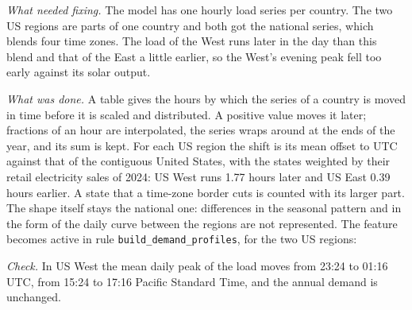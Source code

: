 \textit{What needed fixing.}
The model has one hourly load series per country.
The two US regions are parts of one country and both got the national series, which blends four time zones.
The load of the West runs later in the day than this blend and that of the East a little earlier, so the West's evening peak fell too early against its solar output.

\textit{What was done.}
A table gives the hours by which the series of a country is moved in time before it is scaled and distributed.
A positive value moves it later; fractions of an hour are interpolated, the series wraps around at the ends of the year, and its sum is kept.
For each US region the shift is its mean offset to UTC against that of the contiguous United States, with the states weighted by their retail electricity sales of 2024: US West runs 1.77 hours later and US East 0.39 hours earlier.
A state that a time-zone border cuts is counted with its larger part.
The shape itself stays the national one: differences in the seasonal pattern and in the form of the daily curve between the regions are not represented.
The feature becomes active in rule \texttt{build\_demand\_profiles}, for the two US regions:

\textit{Check.}
In US West the mean daily peak of the load moves from 23:24 to 01:16 UTC, from 15:24 to 17:16 Pacific Standard Time, and the annual demand is unchanged.
